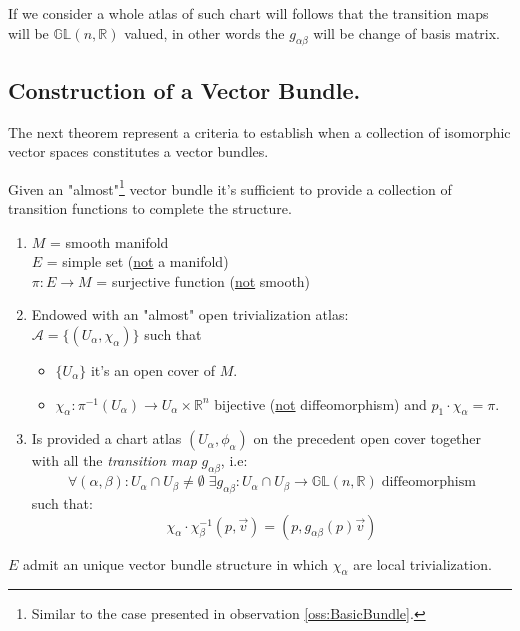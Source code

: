 \documentclass[a4paper,12pt]{scrartcl}    %
\begin{document}
\begin{observation}
If we consider a whole atlas of such chart will follows that the transition maps will be $\mathbb{GL}(n, \mathbb{R})$ valued, in other words the $g_{\alpha \beta}$ will be change of basis matrix.
\end{observation}

\subsection{Construction of a Vector Bundle.}
The next theorem represent a criteria to establish when a collection of isomorphic vector spaces constitutes a vector bundles.
\begin{theorem}\label{Teo: Reconstruction Vector Bundle 1}
Given an "almost"\footnote{Similar to the case presented in observation \ref{oss:BasicBundle}.} vector bundle it's sufficient to provide a collection of transition functions to complete the structure.
	\begin{hypothesis}
			\begin{enumerate}
				\item $M$ = smooth manifold
					\\ $E$ = simple set (\underline{not} a manifold)
					\\ $\pi: E \rightarrow M$ = surjective function (\underline{not} smooth)
				\item Endowed with an "almost" open trivialization atlas:
					\\ $\mathcal{A}= \big\{ (U_{\alpha}, \chi_{\alpha}) \big \}$ such that
						\begin{itemize}
						\item $\{ U_{\alpha} \}$ it's an open cover of $M$.
						\item $\chi_{\alpha} : \pi^{-1}(U_{\alpha}) \rightarrow U_{\alpha} \times \mathbb{R}^n$ bijective (\underline{not} diffeomorphism) and $p_1 \cdot \chi_{\alpha} = \pi$.
						\end{itemize}
				\item Is provided a chart atlas $(U_{\alpha}, \phi_{\alpha})$ on the precedent open cover together with all the \emph{transition map} $g_{\alpha \beta}$, i.e:
				\begin{displaymath}
				\forall (\alpha, \beta) : U_{\alpha} \cap U_{\beta} \neq \emptyset \; \exists g_{\alpha \beta} : U_{\alpha} \cap U_{\beta} \rightarrow \mathbb{GL}(n, \mathbb{R}) \; \textrm{diffeomorphism}
				\end{displaymath}
				such that:
				\begin{displaymath}
					\chi_{\alpha} \cdot \chi_{\beta}^{-1} (p , \vec{v}) = ( p, g_{\alpha \beta}(p) \vec{v} ) 	
				\end{displaymath}					
			\end{enumerate}
	\end{hypothesis}
	
	\begin{thesis}
		$E$ admit an unique vector bundle structure in which $\chi_{\alpha}$ are local trivialization.
	\end{thesis}
\end{theorem}
\end{document}
